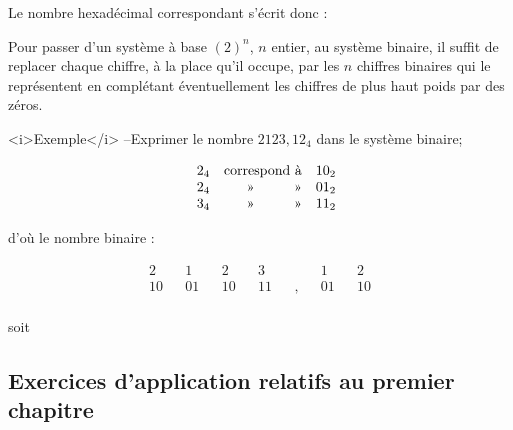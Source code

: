 Le nombre hexadécimal  correspondant s'écrit donc :   


Pour passer d'un système à base $(2)^n$, $n$ entier, au système binaire, il suffit de replacer chaque chiffre, à la place qu'il occupe, par les $n$ chiffres binaires qui le représentent en complétant éventuellement les chiffres de plus haut poids par des zéros.

<i>Exemple</i> --Exprimer le nombre $2123,12_4$ dans le système binaire; 

\[ \begin{array}{@{\hspace*{5mm}}ccl} 
2_4 & \text{correspond à}  & 10_2 \\ 
2_4 & \multicolumn{1}{r}{\text{»\hspace*{1cm}»}}  & 01_2 \\ 
3_4 & \multicolumn{1}{r}{\text{»\hspace*{1cm}»}}  & 11_2 \\ 
\end{array} 
\]


d'où le nombre binaire : 
\medskip

\[
\begin{array}{ccccccccccccc}
2 && 1 && 2 && 3 && && 1 && 2 \\
10 && 01 && 10 && 11 &&, && 01 && 10 \\
\end{array}
\]

soit \hfill {} \hfill

\newpage 

\subsection{Exercices d'application relatifs au premier chapitre}


